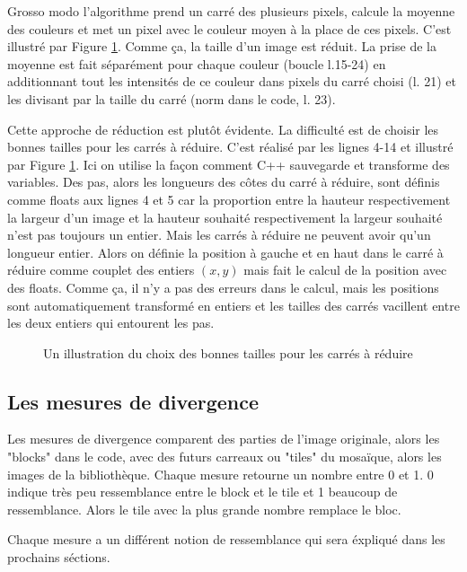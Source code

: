 \documentclass[a4paper]{article}
\begin{document}
 Grosso modo l'algorithme prend un carr\'e des plusieurs pixels, calcule la moyenne des couleurs et met un pixel avec le couleur moyen \`a la place de ces pixels.
C'est illustr\'e par Figure \ref{fig:carres}.
Comme \c{c}a, la taille d'un image est r\'eduit.
La prise de la moyenne est fait s\'epar\'ement pour  chaque couleur (boucle l.15-24) en additionnant tout les intensit\'es de ce couleur dans pixels du carr\'e choisi (l. 21) et les divisant par la taille du carr\'e (norm dans le code, l. 23).

Cette approche de r\'eduction est plut\^ot \'evidente. La difficult\'e est de choisir les bonnes tailles pour les carr\'es \`a r\'eduire.
C'est r\'ealis\'e par les lignes 4-14 et illustr\'e par Figure \ref{fig:carres}.
Ici on utilise la fa\c{c}on comment C++ sauvegarde et transforme des variables.
Des pas, alors les longueurs des c\^otes du carr\'e \`a r\'eduire,  sont d\'efinis comme floats aux lignes 4 et 5 car la proportion entre la hauteur respectivement la largeur d'un image et la hauteur souhait\'e respectivement la largeur souhait\'e n'est pas toujours un entier.
Mais les carr\'es \`a r\'eduire ne peuvent avoir qu'un longueur entier.
Alors on d\'efinie la position \`a gauche et en haut   dans le carr\'e \`a r\'eduire comme couplet des entiers $(x,y)$ mais fait le calcul de la position avec des floats.
Comme \c{c}a, il n'y a pas des erreurs dans le calcul, mais les positions sont automatiquement transform\'e en entiers et les tailles des carr\'es vacillent entre les deux entiers qui entourent les pas.
\begin{figure}
  \centerline{}
  \caption{Un illustration du choix des bonnes tailles pour les carr\'es \`a r\'eduire}
  \label{fig:carres}
\end{figure}

\subsection{Les mesures de divergence}
Les mesures de divergence comparent des parties de l'image originale, alors les "blocks" dans le code, avec des futurs carreaux ou "tiles" du mosa\"ique, alors les images de la biblioth\`eque.
Chaque mesure retourne un nombre entre 0 et 1.
0 indique tr\`es peu ressemblance entre le block et le tile et 1 beaucoup de ressemblance. 
Alors le tile avec la plus grande nombre remplace le bloc.

Chaque mesure a un différent notion de ressemblance qui sera \'expliqu\'e dans les prochains s\'ections.
\end{document}

